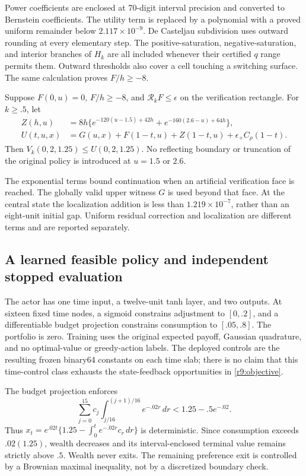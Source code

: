 Power coefficients are enclosed at 70-digit interval precision and converted to Bernstein coefficients. The utility term is replaced by a polynomial with a proved uniform remainder below $2.117\times10^{-9}$. De Casteljau subdivision uses outward rounding at every elementary step. The positive-saturation, negative-saturation, and interior branches of $H_k$ are all included whenever their certified $q$ range permits them. Outward thresholds also cover a cell touching a switching surface. The same calculation proves $F/h\geq-8$.

\begin{proposition}\label{r9:upper}
Suppose $F(0,u)=0$, $F/h\geq-8$, and $\mathcal R_kF\leq\epsilon$ on the verification rectangle. For $k\geq.5$, let
\begin{align}
 Z(h,u)&=8h\{e^{-120(u-1.5)+42h}+e^{-160(2.6-u)+64h}\},\\
 U(t,u,x)&=G(u,x)+F(1-t,u)+Z(1-t,u)+\epsilon_+C_\rho(1-t).
\end{align}
Then $V_k(0,2,1.25)\leq U(0,2,1.25)$. No reflecting boundary or truncation of the original policy is introduced at $u=1.5$ or $2.6$.
\end{proposition}
The exponential terms bound continuation when an artificial verification face is reached. The globally valid upper witness $G$ is used beyond that face. At the central state the localization addition is less than $1.219\times10^{-7}$, rather than an eight-unit initial gap. Uniform residual correction and localization are different terms and are reported separately.

\subsection{A learned feasible policy and independent stopped evaluation}\label{r9:policy}
The actor has one time input, a twelve-unit tanh layer, and two outputs. At sixteen fixed time nodes, a sigmoid constrains adjustment to $[0,.2]$, and a differentiable budget projection constrains consumption to $[.05,.8]$. The portfolio is zero. Training uses the original expected payoff, Gaussian quadrature, and no optimal-value or greedy-action labels. The deployed controls are the resulting frozen binary64 constants on each time slab; there is no claim that this time-control class exhausts the state-feedback opportunities in \eqref{r9:objective}.

The budget projection enforces
\begin{equation}
 \sum_{j=0}^{15}c_j\int_{j/16}^{(j+1)/16}e^{-.02r}\,dr
 <1.25-.5e^{-.02}.\label{r9:budgetprojection}
\end{equation}
Thus $x_t=e^{.02t}\{1.25-\int_0^te^{-.02r}c_r\,dr\}$ is deterministic. Since consumption exceeds $.02(1.25)$, wealth decreases and its interval-enclosed terminal value remains strictly above $.5$. Wealth never exits. The remaining preference exit is controlled by a Brownian maximal inequality, not by a discretized boundary check.

